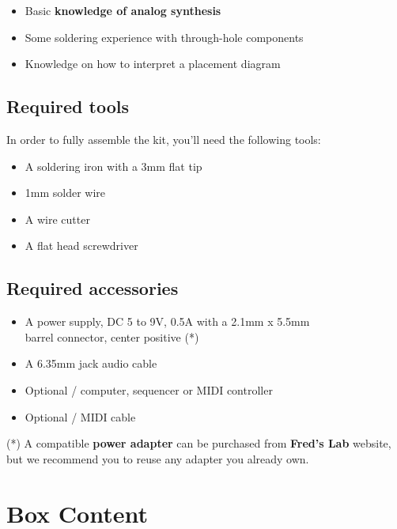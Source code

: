 \documentclass{scrartcl}
\begin{document}
\begin{itemize}
    \item Basic \textbf{knowledge of analog synthesis}
    \item Some soldering experience with through-hole components
    \item Knowledge on how to interpret a placement diagram
\end{itemize}

\subsection{Required tools}

In order to fully assemble the kit, you'll need the following tools:

\begin{itemize}
    \item A soldering iron with a 3mm flat tip
    \item 1mm solder wire
    \item A wire cutter
    \item A flat head screwdriver
\end{itemize}

\subsection{Required accessories}

\begin{itemize}
    \item A power supply, DC 5 to 9V, 0.5A with a 2.1mm x 5.5mm \\
    barrel connector, center positive (*)
    \item A 6.35mm jack audio cable
    \item Optional / computer, sequencer or MIDI controller
    \item Optional / MIDI cable
\end{itemize}

(*) A compatible \textbf{power adapter} can be purchased from \textbf{Fred's Lab} website, \\
but we recommend you to reuse any adapter you already own.

\pagebreak
\section{Box Content}
\end{document}
